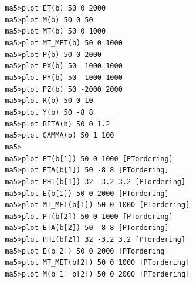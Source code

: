 \documentclass[a4paper, 10pt]{article}
\begin{document}
\texttt{ }\texttt{ }\texttt{ma5>plot ET(b)       50 0 2000\\
}
\texttt{ }\texttt{ }\texttt{ma5>plot M(b)        50 0 50\\
}
\texttt{ }\texttt{ }\texttt{ma5>plot MT(b)       50 0 1000\\
}
\texttt{ }\texttt{ }\texttt{ma5>plot MT\_MET(b)   50 0 1000\\
}
\texttt{ }\texttt{ }\texttt{ma5>plot P(b)        50 0 2000\\
}
\texttt{ }\texttt{ }\texttt{ma5>plot PX(b)       50 -1000 1000\\
}
\texttt{ }\texttt{ }\texttt{ma5>plot PY(b)       50 -1000 1000\\
}
\texttt{ }\texttt{ }\texttt{ma5>plot PZ(b)       50 -2000 2000\\
}
\texttt{ }\texttt{ }\texttt{ma5>plot R(b)        50 0 10\\
}
\texttt{ }\texttt{ }\texttt{ma5>plot Y(b)        50 -8 8\\
}
\texttt{ }\texttt{ }\texttt{ma5>plot BETA(b)     50 0 1.2\\
}
\texttt{ }\texttt{ }\texttt{ma5>plot GAMMA(b)    50 1 100\\
}
\texttt{ }\texttt{ }\texttt{ma5>\\
}
\texttt{ }\texttt{ }\texttt{ma5>plot PT(b[1])      50 0 1000 [PTordering]\\
}
\texttt{ }\texttt{ }\texttt{ma5>plot ETA(b[1])     50 -8 8 [PTordering]\\
}
\texttt{ }\texttt{ }\texttt{ma5>plot PHI(b[1])     32 -3.2 3.2 [PTordering]\\
}
\texttt{ }\texttt{ }\texttt{ma5>plot E(b[1])       50 0 2000 [PTordering]\\
}
\texttt{ }\texttt{ }\texttt{ma5>plot MT\_MET(b[1])  50 0 1000 [PTordering]\\
}
\texttt{ }\texttt{ }\texttt{ma5>plot PT(b[2])      50 0 1000 [PTordering]\\
}
\texttt{ }\texttt{ }\texttt{ma5>plot ETA(b[2])     50 -8 8 [PTordering]\\
}
\texttt{ }\texttt{ }\texttt{ma5>plot PHI(b[2])     32 -3.2 3.2 [PTordering]\\
}
\texttt{ }\texttt{ }\texttt{ma5>plot E(b[2])       50 0 2000 [PTordering]\\
}
\texttt{ }\texttt{ }\texttt{ma5>plot MT\_MET(b[2])  50 0 1000 [PTordering]\\
}
\texttt{ }\texttt{ }\texttt{ma5>plot M(b[1] b[2])  50 0 2000 [PTordering]\\
}
\end{document}
